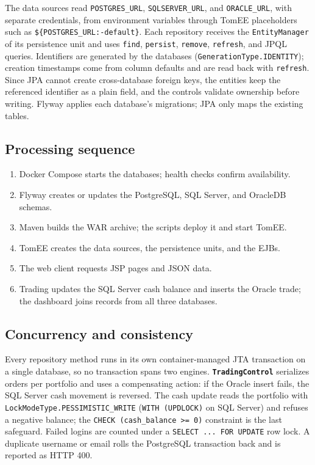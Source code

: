 \documentclass[12pt,a4paper]{article}
\newcommand{\code}[1]{\texttt{\small #1}}
\newcommand{\class}[1]{\textbf{\code{#1}}}
\begin{document}
The data sources read \code{POSTGRES\_URL}, \code{SQLSERVER\_URL}, and
\code{ORACLE\_URL}, with separate credentials, from environment variables
through TomEE placeholders such as \code{\$\{POSTGRES\_URL:-default\}}. Each
repository receives the \code{EntityManager} of its persistence unit and uses
\code{find}, \code{persist}, \code{remove}, \code{refresh}, and JPQL queries.
Identifiers are generated by the databases
(\code{GenerationType.IDENTITY}); creation timestamps come from column
defaults and are read back with \code{refresh}. Since JPA cannot create
cross-database foreign keys, the entities keep the referenced identifier as a
plain field, and the controls validate ownership before writing. Flyway
applies each database's migrations; JPA only maps the existing tables.

\subsection{Processing sequence}

\begin{enumerate}
    \item Docker Compose starts the databases; health checks confirm
    availability.
    \item Flyway creates or updates the PostgreSQL, SQL Server, and OracleDB
    schemas.
    \item Maven builds the WAR archive; the scripts deploy it and start
    TomEE.
    \item TomEE creates the data sources, the persistence units, and the EJBs.
    \item The web client requests JSP pages and JSON data.
    \item Trading updates the SQL Server cash balance and inserts the Oracle
    trade; the dashboard joins records from all three databases.
\end{enumerate}

\subsection{Concurrency and consistency}

Every repository method runs in its own container-managed JTA transaction on a single
database, so no transaction spans two engines. \class{TradingControl}
serializes orders per portfolio and uses a compensating action: if the
Oracle insert fails, the SQL Server cash movement is reversed. The cash
update reads the portfolio with \code{LockModeType.PESSIMISTIC\_WRITE}
(\code{WITH (UPDLOCK)} on SQL Server) and refuses a negative balance; the
\code{CHECK (cash\_balance >= 0)} constraint is the last safeguard. Failed
logins are counted under a \code{SELECT ... FOR UPDATE} row lock. A
duplicate username or email rolls the PostgreSQL transaction back and is
reported as HTTP 400.
\end{document}
